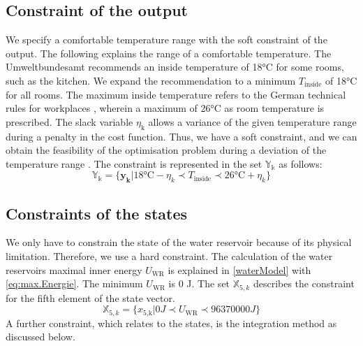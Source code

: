\subsection{Constraint of the output}
\label{subsec:constrainY}
We specify a comfortable temperature range with the soft constraint of the output. The following explains the range of a comfortable temperature.\newline
The Umweltbundesamt \cite{Umweltbundesamt.7.10.2021} recommends an inside temperature of 18°C for some rooms, such as the kitchen. We expand the recommendation to a minimum $T_\text{inside}$ of 18°C for all rooms. The maximum inside temperature refers to the German technical rules for workplaces \cite{Bund.2021}, wherein a maximum of 26°C as room temperature is prescribed. The slack variable $\eta_\text{k}$ allows a variance of the given temperature range during a penalty in the cost function. Thus, we have a soft constraint, and we can obtain the feasibility of the optimisation problem during a deviation of the temperature range \cite{Drgona.2020}. The constraint is represented in the set $\mathbb{Y_k}$ as follows:  
\begin{equation}
    \label{ConstraintY}
    \mathbb{Y_k} = \{\mathbf{y_k}| 18 \text{°C} - \eta_k \prec T_\text{inside} \prec 26 \text{°C}+ \eta_k\} 
\end{equation}

\subsection{Constraints of the states}
\label{ConstraintX}
We only have to constrain the state of the water reservoir because of its physical limitation. Therefore, we use a hard constraint.
The calculation of the water reservoirs maximal inner energy $U_\text{WR}$ is explained in \autoref{waterModel} with \autoref{eq:max.Energie}. The minimum $U_\text{WR}$ is 0 J. The set $\mathbb{X}_{5,k}$ describes the constraint for the fifth element of the state vector.
\begin{equation}
    \label{ConstraintX5}
    \mathbb{X}_{5,k} = \{x_\text{5,k}| 0 J \prec U_\text{WR} \prec 96370000 J\} 
\end{equation}
A further constraint, which relates to the states, is the integration method as discussed below.

